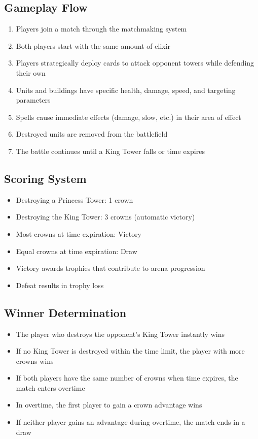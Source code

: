 \documentclass{article}
\begin{document}
\subsection{Gameplay Flow}
\begin{enumerate}
    \item Players join a match through the matchmaking system
    \item Both players start with the same amount of elixir
    \item Players strategically deploy cards to attack opponent towers while defending their own
    \item Units and buildings have specific health, damage, speed, and targeting parameters
    \item Spells cause immediate effects (damage, slow, etc.) in their area of effect
    \item Destroyed units are removed from the battlefield
    \item The battle continues until a King Tower falls or time expires
\end{enumerate}

\subsection{Scoring System}
\begin{itemize}
    \item Destroying a Princess Tower: 1 crown
    \item Destroying the King Tower: 3 crowns (automatic victory)
    \item Most crowns at time expiration: Victory
    \item Equal crowns at time expiration: Draw
    \item Victory awards trophies that contribute to arena progression
    \item Defeat results in trophy loss
\end{itemize}

\subsection{Winner Determination}
\begin{itemize}
    \item The player who destroys the opponent's King Tower instantly wins
    \item If no King Tower is destroyed within the time limit, the player with more crowns wins
    \item If both players have the same number of crowns when time expires, the match enters overtime
    \item In overtime, the first player to gain a crown advantage wins
    \item If neither player gains an advantage during overtime, the match ends in a draw
\end{itemize}
\end{document}

